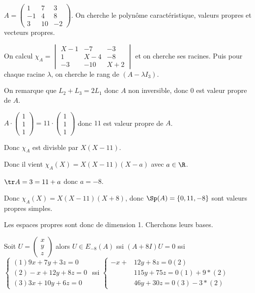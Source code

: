 \begin{exemple}
    $A = \begin{pmatrix}
        1 & 7 & 3 \\
        -1 & 4 & 8 \\
        3 & 10 & -2
    \end{pmatrix}$. On cherche le polynôme caractéristique, valeurs propres et vecteurs propres. 


    \svspace On calcul $\chi_A = \begin{vmatrix}
        X - 1 & -7 & -3 \\
        1 & X - 4 & -8 \\
        -3 & -10 & X + 2
    \end{vmatrix}$ et on cherche ses racines. Puis pour chaque racine $\lambda$, on cherche le rang de 
    $(A - \lambda I_3)$.


    \svspace On remarque que $L_2 + L_3 = 2 L_1$ donc $A$ non inversible, donc $0$ est valeur propre de $A$. 

    $A \cdot \begin{pmatrix}
        1 \\
        1 \\
        1
    \end{pmatrix} = 11 \cdot \begin{pmatrix}
        1 \\
        1 \\
        1
    \end{pmatrix}$ donc $11$ est valeur propre de $A$.

    Donc $\chi_A$ est divisble par $X(X - 11)$.

    Donc il vient $\chi_A(X) = X(X - 11)(X - a)$ avec $a \in \R$.

    $\tr A = 3 = 11 + a$ donc $a = -8$.

    Donc $\chi_A(X) = X(X - 11)(X + 8)$, donc $\Sp(A) = \{0, 11, -8\}$ sont valeurs propres simples.

    Les espaces propres sont donc de dimension 1. Cherchons leurs bases. 

    Soit $U = \begin{pmatrix}
        x \\
        y \\
        z   
    \end{pmatrix}$ alors $U \in E_{-8}(A)$ ssi $(A + 8I) U = 0$ ssi $\begin{cases}
        (1) 9x + 7y + 3z = 0 \\
        (2) -x + 12y + 8z = 0 \\
        (3) 3x + 10y + 6z = 0
    \end{cases}$ ssi $\begin{cases}
        -x +  & 12y + 8z = 0 (2)\\
        & 115y + 75 z = 0 (1) + 9*(2) \\
        & 46 y + 30 z = 0 (3) - 3*(2)
    \end{cases}$ 
    

\end{exemple}
